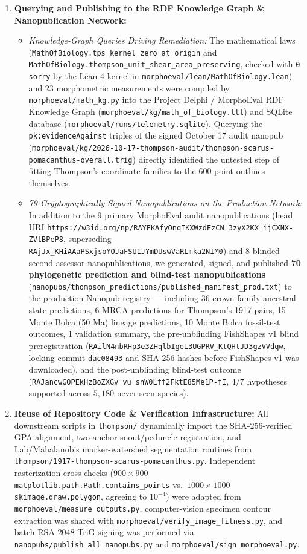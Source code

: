 \documentclass[11pt,a4paper]{article}
\theoremstyle{definition}
\theoremstyle{remark}
\begin{document}
\begin{enumerate}
  \item \textbf{Querying and Publishing to the RDF Knowledge Graph \& Nanopublication Network:}
  \begin{itemize}
    \item \emph{Knowledge-Graph Queries Driving Remediation:} The mathematical laws (\texttt{MathOfBiology.tps\_kernel\_zero\_at\_origin} and \texttt{MathOfBiology.thompson\_unit\_shear\_area\_preserving}, checked with \texttt{0 sorry} by the Lean 4 kernel in \texttt{morphoeval/lean/MathOfBiology.lean}) and 23 morphometric measurements were compiled by \texttt{morphoeval/math\_kg.py} into the Project Delphi / MorphoEval RDF Knowledge Graph (\texttt{morphoeval/kg/math\_of\_biology.ttl}) and SQLite database (\texttt{morphoeval/runs/telemetry.sqlite}). Querying the \texttt{pk:evidenceAgainst} triples of the signed October 17 audit nanopub (\texttt{morphoeval/kg/2026-10-17-thompson-audit/thompson-scarus-pomacanthus-overall.trig}) directly identified the untested step of fitting Thompson's coordinate families to the 600-point outlines themselves.
    \item \emph{79 Cryptographically Signed Nanopublications on the Production Network:} In addition to the 9 primary MorphoEval audit nanopublications (head URI \texttt{https://w3id.org/np/RAYFKAfyOnqIKXWzdEzCN\_3zyX2KX\_ijCXNX-ZVtBPeP8}, superseding \texttt{RAjJx\_KHiAAaPSxjsoYOJaFSU1JYmDUswVaRLmka2NIM0}) and 8 blinded second-assessor nanopublications, we generated, signed, and published \textbf{70 phylogenetic prediction and blind-test nanopublications} (\texttt{nanopubs/thompson\_predictions/published\_manifest\_prod.txt}) to the production Nanopub registry --- including 36 crown-family ancestral state predictions, 6 MRCA predictions for Thompson's 1917 pairs, 15 Monte Bolca (50 Ma) lineage predictions, 10 Monte Bolca fossil-test outcomes, 1 validation summary, the pre-unblinding FishShapes v1 blind preregistration (\texttt{RAilN4nbRHp3e3ZHqlbIgeL3UGPRV\_KtQHtJD3gzVVdqw}, locking commit \texttt{dac08493} and SHA-256 hashes before FishShapes v1 was downloaded), and the post-unblinding blind-test outcome (\texttt{RAJancwGOPEkHzBoZXGv\_vu\_snW0Lff2FktE85Me1P-fI}, $4/7$ hypotheses supported across $5{,}180$ never-seen species).
  \end{itemize}

  \item \textbf{Reuse of Repository Code \& Verification Infrastructure:}
  All downstream scripts in \texttt{thompson/} dynamically import the SHA-256-verified GPA alignment, two-anchor snout/peduncle registration, and Lab/Mahalanobis marker-watershed segmentation routines from \texttt{thompson/1917-thompson-scarus-pomacanthus.py}. Independent rasterization cross-checks ($900 \times 900$ \texttt{matplotlib.path.Path.contains\_points} vs.\ $1000 \times 1000$ \texttt{skimage.draw.polygon}, agreeing to $10^{-4}$) were adapted from \texttt{morphoeval/measure\_outputs.py}, computer-vision specimen contour extraction was shared with \texttt{morphoeval/verify\_image\_fitness.py}, and batch RSA-2048 TriG signing was performed via \texttt{nanopubs/publish\_all\_nanopubs.py} and \texttt{morphoeval/sign\_morphoeval.py}.
\end{enumerate}
\end{document}
